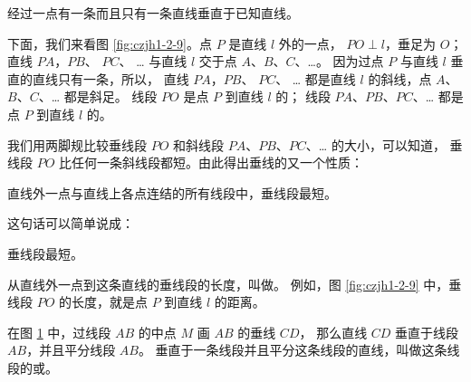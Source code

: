 \begin{xingzhi}
    经过一点有一条而且只有一条直线垂直于已知直线。
\end{xingzhi}

下面，我们来看图 \ref{fig:czjh1-2-9}。点 $P$ 是直线 $l$ 外的一点， $PO \perp l$，垂足为 $O$；
直线 $PA$，$PB$、 $PC$、 … 与直线 $l$ 交于点 $A$、$B$、$C$、…。
因为过点 $P$ 与直线 $l$ 垂直的直线只有一条，所以，
直线 $PA$，$PB$、 $PC$、 …  \; 都是直线 $l$ 的斜线，点 $A$、$B$、$C$、… \; 都是斜足。
线段 $PO$ 是点 $P$ 到直线 $l$ 的；
线段 $PA$、$PB$、$PC$、… 都是点 $P$ 到直线 $l$ 的。

\begin{figure}[htbp]
    \centering
    \begin{minipage}[b]{7cm}
        \centering
        
        \caption{}\label{fig:czjh1-2-9}
    \end{minipage}
    \qquad
    \begin{minipage}[b]{7cm}
        \centering
        
        \caption{}\label{fig:czjh1-2-10}
    \end{minipage}
\end{figure}

我们用两脚规比较垂线段 $PO$ 和斜线段 $PA$、$PB$、$PC$、… 的大小，可以知道，
垂线段 $PO$ 比任何一条斜线段都短。由此得出垂线的又一个性质：

\begin{xingzhi}
    直线外一点与直线上各点连结的所有线段中，垂线段最短。
\end{xingzhi}

这句话可以简单说成：
\begin{xingzhi}
    垂线段最短。
\end{xingzhi}

从直线外一点到这条直线的垂线段的长度，叫做。
例如，图 \ref{fig:czjh1-2-9} 中，垂线段 $PO$ 的长度，就是点 $P$ 到直线 $l$ 的距离。

在图 \ref{fig:czjh1-2-10} 中，过线段 $AB$ 的中点 $M$ 画 $AB$ 的垂线 $CD$，
那么直线 $CD$ 垂直于线段 $AB$，并且平分线段 $AB$。
垂直于一条线段并且平分这条线段的直线，叫做这条线段的或。

